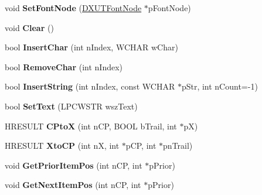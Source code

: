 \begin{DoxyCompactItemize}
\item 
\hypertarget{class_c_uni_buffer_abfc7664ed4c8da9b254dc75137da17b3}{void {\bfseries Set\+Font\+Node} (\hyperlink{struct_d_x_u_t_font_node}{D\+X\+U\+T\+Font\+Node} $\ast$p\+Font\+Node)}\label{class_c_uni_buffer_abfc7664ed4c8da9b254dc75137da17b3}

\item 
\hypertarget{class_c_uni_buffer_a6939a6f250ac4d32314e2124f17a037f}{void {\bfseries Clear} ()}\label{class_c_uni_buffer_a6939a6f250ac4d32314e2124f17a037f}

\item 
\hypertarget{class_c_uni_buffer_a23dfb66bd7d577ca78d55f387945b635}{bool {\bfseries Insert\+Char} (int n\+Index, W\+C\+H\+A\+R w\+Char)}\label{class_c_uni_buffer_a23dfb66bd7d577ca78d55f387945b635}

\item 
\hypertarget{class_c_uni_buffer_a2b0be4cc48030eab8027b9c27c11b3ba}{bool {\bfseries Remove\+Char} (int n\+Index)}\label{class_c_uni_buffer_a2b0be4cc48030eab8027b9c27c11b3ba}

\item 
\hypertarget{class_c_uni_buffer_a7c4687bd6d8d4cafd7842b9097089c8e}{bool {\bfseries Insert\+String} (int n\+Index, const W\+C\+H\+A\+R $\ast$p\+Str, int n\+Count=-\/1)}\label{class_c_uni_buffer_a7c4687bd6d8d4cafd7842b9097089c8e}

\item 
\hypertarget{class_c_uni_buffer_a1d0bcdd0278d7d49bfc4dd00898730b2}{bool {\bfseries Set\+Text} (L\+P\+C\+W\+S\+T\+R wsz\+Text)}\label{class_c_uni_buffer_a1d0bcdd0278d7d49bfc4dd00898730b2}

\item 
\hypertarget{class_c_uni_buffer_a9d8522f9cb2fcc14b0e9e43cd4b70f44}{H\+R\+E\+S\+U\+L\+T {\bfseries C\+Pto\+X} (int n\+C\+P, B\+O\+O\+L b\+Trail, int $\ast$p\+X)}\label{class_c_uni_buffer_a9d8522f9cb2fcc14b0e9e43cd4b70f44}

\item 
\hypertarget{class_c_uni_buffer_adea62d3f30ad870b207d8816b0a1ce89}{H\+R\+E\+S\+U\+L\+T {\bfseries Xto\+C\+P} (int n\+X, int $\ast$p\+C\+P, int $\ast$pn\+Trail)}\label{class_c_uni_buffer_adea62d3f30ad870b207d8816b0a1ce89}

\item 
\hypertarget{class_c_uni_buffer_aef3e042ec363325c37371880c0490aa4}{void {\bfseries Get\+Prior\+Item\+Pos} (int n\+C\+P, int $\ast$p\+Prior)}\label{class_c_uni_buffer_aef3e042ec363325c37371880c0490aa4}

\item 
\hypertarget{class_c_uni_buffer_a925e667b4bdfa744f41d1fc4852d2ab1}{void {\bfseries Get\+Next\+Item\+Pos} (int n\+C\+P, int $\ast$p\+Prior)}\label{class_c_uni_buffer_a925e667b4bdfa744f41d1fc4852d2ab1}

\end{DoxyCompactItemize}
